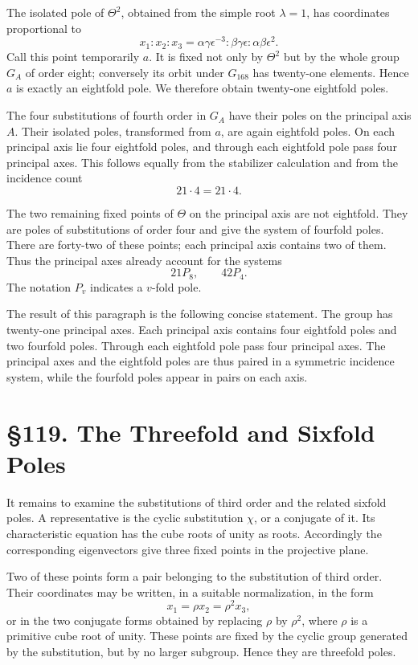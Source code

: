 \documentclass[11pt,a4paper]{book}
\newcommand{\webersection}[2]{\clearpage\section*{\S #1. #2}}
\begin{document}
The isolated pole of \(\Theta^2\), obtained from the simple root \(\lambda=1\), has coordinates proportional to
\[
 x_1:x_2:x_3=\alpha\gamma\epsilon^{-3}:
              \beta\gamma\epsilon:
              \alpha\beta\epsilon^{2}.
\]
Call this point temporarily \(a\).  It is fixed not only by \(\Theta^2\) but by the whole group \(G_A\) of order eight; conversely its orbit under \(G_{168}\) has twenty-one elements.  Hence \(a\) is exactly an eightfold pole.  We therefore obtain twenty-one eightfold poles.

The four substitutions of fourth order in \(G_A\) have their poles on the principal axis \(A\).  Their isolated poles, transformed from \(a\), are again eightfold poles.  On each principal axis lie four eightfold poles, and through each eightfold pole pass four principal axes.  This follows equally from the stabilizer calculation and from the incidence count
\[
21\cdot 4=21\cdot 4.
\]

The two remaining fixed points of \(\Theta\) on the principal axis are not eightfold.  They are poles of substitutions of order four and give the system of fourfold poles.  There are forty-two of these points; each principal axis contains two of them.  Thus the principal axes already account for the systems
\[
21P_8,
\qquad 42P_4.
\]
The notation \(P_v\) indicates a \(v\)-fold pole.

The result of this paragraph is the following concise statement.  The group has twenty-one principal axes.  Each principal axis contains four eightfold poles and two fourfold poles.  Through each eightfold pole pass four principal axes.  The principal axes and the eightfold poles are thus paired in a symmetric incidence system, while the fourfold poles appear in pairs on each axis.

\webersection{119}{The Threefold and Sixfold Poles}

It remains to examine the substitutions of third order and the related sixfold poles.  A representative is the cyclic substitution \(\chi\), or a conjugate of it.  Its characteristic equation has the cube roots of unity as roots.  Accordingly the corresponding eigenvectors give three fixed points in the projective plane.

Two of these points form a pair belonging to the substitution of third order.  Their coordinates may be written, in a suitable normalization, in the form
\[
 x_1=\rho x_2=\rho^2x_3,
\]
or in the two conjugate forms obtained by replacing \(\rho\) by \(\rho^2\), where \(\rho\) is a primitive cube root of unity.  These points are fixed by the cyclic group generated by the substitution, but by no larger subgroup.  Hence they are threefold poles.
\end{document}
